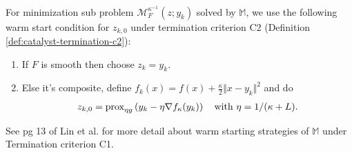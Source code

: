 \documentclass[12pt]{article}
\begin{document}
            \begin{assumption}\label{ass:warm-start-c2}\;\\
                For minimization sub problem $\mathcal M^{\kappa^{-1}}_F(z; y_k)$ solved by $\mathbb M$, we use the following warm start condition for $z_{k, 0}$ under termination criterion C2 (Definition \ref{def:catalyst-termination-c2}): 
                \begin{enumerate}
                    \item If $F$ is smooth then choose $z_k = y_k$. 
                    \item Else it's composite, define $f_k(x) = f(x) + \frac{\kappa}{2}\Vert x - y_k\Vert^2$ and do 
                    \begin{align*}
                        z_{k, 0} = \operatorname{prox}_{\eta g}\left(
                            y_k - \eta\nabla f_\kappa(y_k)
                        \right) \quad \text{with } \eta = 1/(\kappa + L). 
                    \end{align*}
                \end{enumerate}
            \end{assumption}
            \begin{remark}
                See pg 13 of Lin et al. for more detail about warm starting strategies of $\mathbb M$ under Termination criterion C1. 
            \end{remark}
\end{document}
